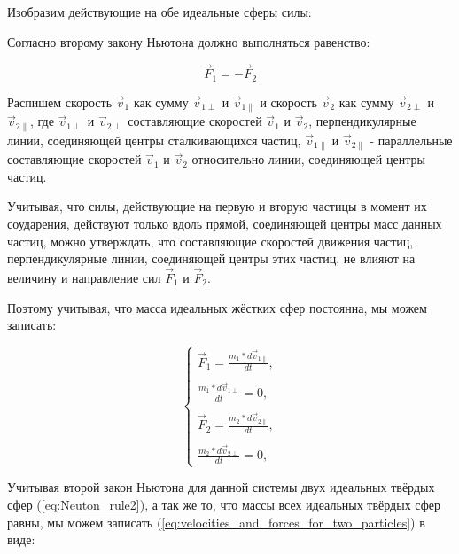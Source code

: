 \documentclass[a4paper]{article}
\begin{document}
Изобразим действующие на обе идеальные сферы силы:


Согласно второму закону Ньютона должно выполняться равенство:

\begin{equation}\label{eq:Neuton_rule2}
        \vec{F}_1 = - \vec{F}_2
\end{equation}

Распишем скорость $ \vec{v}_1 $ как сумму $ \vec{v}_{1\perp} $ и $ \vec{v}_{1\parallel} $ и скорость $ \vec{v}_2 $ как сумму $ \vec{v}_{2\perp} $ и $ \vec{v}_{2\parallel} $, где $ \vec{v}_{1\perp} $ и $ \vec{v}_{2\perp} $ составляющие скоростей $ \vec{v}_1 $ и $ \vec{v}_2 $, перпендикулярные линии, соединяющей центры сталкивающихся частиц, $ \vec{v}_{1\parallel} $ и $ \vec{v}_{2\parallel} $ - параллельные составляющие скоростей $ \vec{v}_1 $ и $ \vec{v}_2 $ относительно линии, соединяющей центры частиц.

Учитывая, что силы, действующие на первую и вторую частицы в момент их соударения, действуют только вдоль прямой, соединяющей центры масс данных частиц, можно утверждать, что составляющие скоростей движения частиц, перпендикулярные линии, соединяющей центры этих частиц, не влияют на величину и направление сил $ \vec{F}_1 $ и $ \vec{F}_2 $.

Поэтому учитывая, что масса идеальных жёстких сфер постоянна, мы можем записать:

\begin{equation}\label{eq:velocities_and_forces_for_two_particles}
    \begin{cases}
        \vec{F}_1 = \displaystyle\frac{m_1*d\vec{v}_{1\parallel}}{dt},
        \\
        \\
        \displaystyle\frac{m_1*d\vec{v}_{1\perp}}{dt} = 0,
        \\
        \\
        \vec{F}_2 = \displaystyle\frac{m_2*d\vec{v}_{2\parallel}}{dt},
        \\
        \\
        \displaystyle\frac{m_2*d\vec{v}_{2\perp}}{dt} = 0,
    \end{cases}
\end{equation}

Учитывая второй закон Ньютона для данной системы двух идеальных твёрдых сфер (\ref{eq:Neuton_rule2}), а так же то, что массы всех идеальных твёрдых сфер равны, мы можем записать (\ref{eq:velocities_and_forces_for_two_particles}) в виде:
\end{document}
